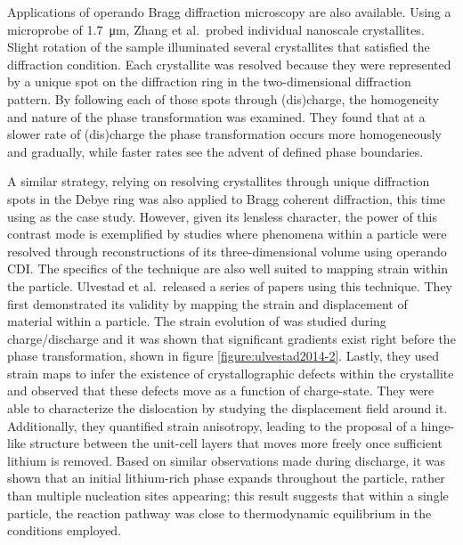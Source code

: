 \documentclass[journal=cmatex,manuscript=perspective]{achemso}
\begin{document}
Applications of operando Bragg diffraction microscopy are also
available. Using a microprobe of \SI{1.7}{\micro\meter}, Zhang et
al.\ probed individual nanoscale 
crystallites\cite{zhang2015-2}. Slight rotation of the sample
illuminated several crystallites that satisfied the diffraction
condition. Each crystallite was resolved because they were represented
by a unique spot on the diffraction ring in the two-dimensional
diffraction pattern. By following each of those spots through
(dis)charge, the homogeneity and nature of the phase transformation
was examined. They found that at a slower rate of (dis)charge the
phase transformation occurs more homogeneously and gradually, while
faster rates see the advent of defined phase
boundaries\cite{zhang2015-2}.

A similar strategy, relying on resolving crystallites through unique
diffraction spots in the Debye ring was also applied to Bragg coherent
diffraction, this time using  as the case
study\cite{singer2014}. However, given its lensless character, the
power of this contrast mode is exemplified by studies where phenomena
within a particle were resolved through reconstructions of its
three-dimensional volume using operando CDI. The specifics of the
technique are also well suited to mapping strain within the
particle. Ulvestad et al.\ released a series of papers using this
technique. They first demonstrated its validity by mapping the strain
and displacement of material within a particle\cite{ulvestad2014}. The
strain evolution of  was studied during
charge/discharge and it was shown that significant gradients exist
right before the phase transformation, shown in figure
\ref{figure:ulvestad2014-2}\cite{ulvestad2014-2}. Lastly, they used
strain maps to infer the existence of crystallographic defects within
the crystallite and observed that these defects move as a function of
charge-state\cite{ulvestad2015}. They were able to characterize the
dislocation by studying the displacement field around
it. Additionally, they quantified strain anisotropy, leading to the
proposal of a hinge-like structure between the unit-cell layers that
moves more freely once sufficient lithium is removed. Based on similar
observations made during discharge, it was shown that an initial
lithium-rich phase expands throughout the particle, rather than
multiple nucleation sites appearing; this result suggests that within
a single particle, the reaction pathway was close to thermodynamic
equilibrium in the conditions employed.
\end{document}
